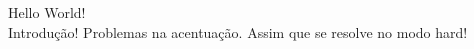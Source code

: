 \documentclass[10pt,a4paper]{book}
\begin{document}
 
	Hello World! \\ 
	Introdução!
	Problemas na acentua\c{c}\~ao. Assim que se resolve no modo hard!
	
\end{document}

